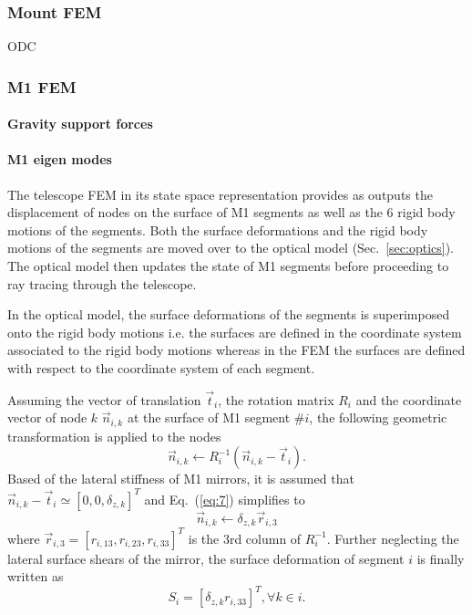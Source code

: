 \documentclass{gmto}
\begin{document}
\subsubsection{Mount FEM}
\label{sec:mount-fem}

ODC\cite{}

\subsubsection{M1 FEM}
\label{sec:m1-fem}

\paragraph{Gravity support forces}

\paragraph{M1 eigen modes}

The telescope FEM in its state space representation provides as outputs the
displacement of nodes on the surface of M1 segments as well as the 6 rigid body
motions of the segments.
Both the surface deformations and the rigid body motions of the segments are
moved over to the optical model (Sec.~\ref{sec:optics}).
The optical model then updates the state of M1 segments before proceeding to ray
tracing through the telescope.

In the optical model, the surface deformations of the segments is superimposed
onto the rigid body motions i.e. the surfaces are defined in the coordinate system
associated to the rigid body motions whereas in the FEM the surfaces are defined with
respect to the coordinate system of each segment\cite{GMTO.CoordinateSystems}.

Assuming the vector of translation $\vec t_i$, the rotation matrix $R_i$ and the
coordinate vector of node $k$ $\vec n_{i,k}$ at the surface of M1 segment \#$i$, the following
geometric transformation is applied to the nodes
\begin{equation}
  \label{eq:7}
  \vec n_{i,k} \leftarrow R_i^{-1}(\vec n_{i,k}-\vec t_i).
\end{equation}
Based of the lateral stiffness of M1 mirrors, it is assumed that $\vec
n_{i,k}-\vec t_i \simeq [0,0,\delta_{z,k}]^T$ and Eq.~(\ref{eq:7}) simplifies to
\begin{equation}
  \label{eq:8}
  \vec n_{i,k} \leftarrow \delta_{z,k} \vec r_{i,3} 
\end{equation}
where $\vec r_{i,3} = [r_{i,13},r_{i,23},r_{i,33}]^T$ is the 3rd column of $R_i^{-1}$.
Further neglecting the lateral surface shears of the mirror, the surface
deformation of segment $i$ is finally written as
\begin{equation}
  \label{eq:8}
  S_i = [\delta_{z,k}r_{i,33}]^T,\forall k \in i.
\end{equation}
\end{document}
